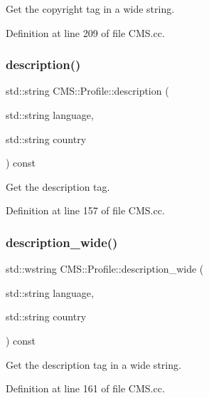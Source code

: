 Get the copyright tag in a wide string. 



Definition at line 209 of file C\+M\+S.\+cc.

\mbox{\label{class_c_m_s_1_1_profile_a1b2e3e2229a9cc307aa6bc4993640815}} 
\subsubsection{\texorpdfstring{description()}{description()}}
{\footnotesize\ttfamily std\+::string C\+M\+S\+::\+Profile\+::description (\begin{DoxyParamCaption}\item[{std\+::string}]{language,  }\item[{std\+::string}]{country }\end{DoxyParamCaption}) const}



Get the description tag. 



Definition at line 157 of file C\+M\+S.\+cc.

\mbox{\label{class_c_m_s_1_1_profile_a0c533b394f01ba7ea265652c77459ad7}} 
\subsubsection{\texorpdfstring{description\+\_\+wide()}{description\_wide()}}
{\footnotesize\ttfamily std\+::wstring C\+M\+S\+::\+Profile\+::description\+\_\+wide (\begin{DoxyParamCaption}\item[{std\+::string}]{language,  }\item[{std\+::string}]{country }\end{DoxyParamCaption}) const}



Get the description tag in a wide string. 



Definition at line 161 of file C\+M\+S.\+cc.

